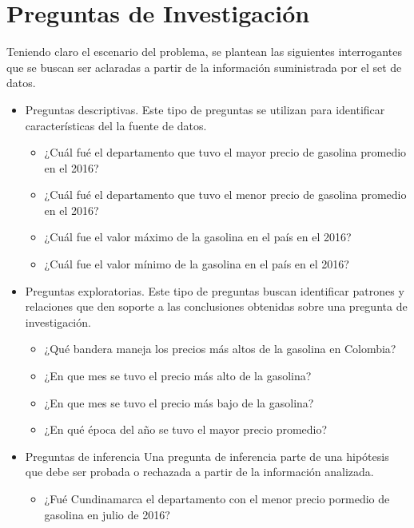 \section{Preguntas de Investigación}
Teniendo claro el escenario del problema, se plantean las siguientes interrogantes que se buscan ser aclaradas a partir de la información suministrada por el set de datos.
 \begin{itemize}
  \item{Preguntas descriptivas.}
  Este tipo de preguntas se utilizan para identificar características del la fuente de datos.
  \begin{itemize}
   \item ¿Cuál fué el departamento que tuvo el mayor precio de gasolina promedio en el 2016?
   \item ¿Cuál fué el departamento que tuvo el menor precio de gasolina promedio en el 2016?
   \item ¿Cuál fue el valor máximo de la gasolina en el país en el 2016?
   \item ¿Cuál fue el valor mínimo de la gasolina en el país en el 2016?
  \end{itemize}
  \item{Preguntas exploratorias.}
   Este tipo de preguntas buscan identificar patrones y relaciones que den soporte a las conclusiones obtenidas sobre una pregunta de investigación.
  \begin{itemize}
   \item ¿Qué bandera maneja los precios más altos de la gasolina en Colombia?
   \item ¿En que mes se tuvo el precio más alto de la gasolina?
   \item ¿En que mes se tuvo el precio más bajo de la gasolina?  
   \item ¿En qué época del año se tuvo el mayor precio promedio?
  \end{itemize}
  \item{Preguntas de inferencia}
   Una pregunta de inferencia parte de una hipótesis que debe ser probada o rechazada a partir de la información analizada.
  \begin{itemize}
   \item ¿Fué Cundinamarca el departamento con el menor precio pormedio de gasolina en julio de 2016?
  \end{itemize}
 \end{itemize}